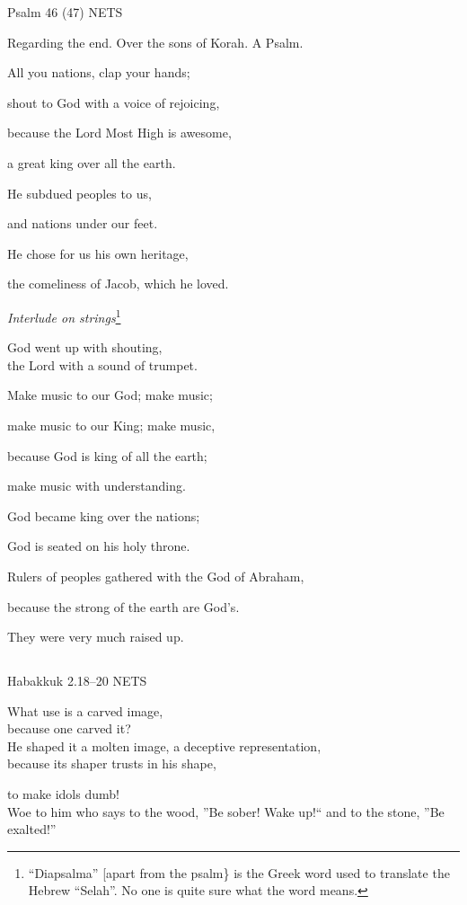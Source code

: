 \documentclass[
]{article}
\newcommand{\RL}[1]{\beginR #1\endR}
\begin{document}
Psalm 46 (47) NETS

Regarding the end. Over the sons of Korah. A Psalm.

All you nations, clap your hands;

shout to God with a voice of rejoicing,

because the Lord Most High is awesome,

a great king over all the earth.

He subdued peoples to us,

and nations under our feet.

He chose for us his own heritage,

the comeliness of Jacob, which he loved.

\emph{Interlude on strings}\footnote{``Diapsalma'' {[}apart from the
  psalm\} is the Greek word used to translate the Hebrew ``Selah''. No
  one is quite sure what the word means.}

God went up with shouting,\\
the Lord with a sound of trumpet.

Make music to our God; make music;

make music to our King; make music,

because God is king of all the earth;

make music with understanding.

God became king over the nations;

God is seated on his holy throne.

Rulers of peoples gathered with the God of Abraham,

because the strong of the earth are God\RL{'}s.

They were very much raised up.

\subsection{}\label{section-2}

Habakkuk 2.18--20 NETS

What use is a carved image,\\
because one carved it?\\
He shaped it a molten image, a deceptive representation,\\
because its shaper trusts in his shape,

to make idols dumb!\\
Woe to him who says to the wood, \RL{''}Be sober! Wake up!``\hfill\break
and to the stone, \RL{''}Be exalted!''
\end{document}
